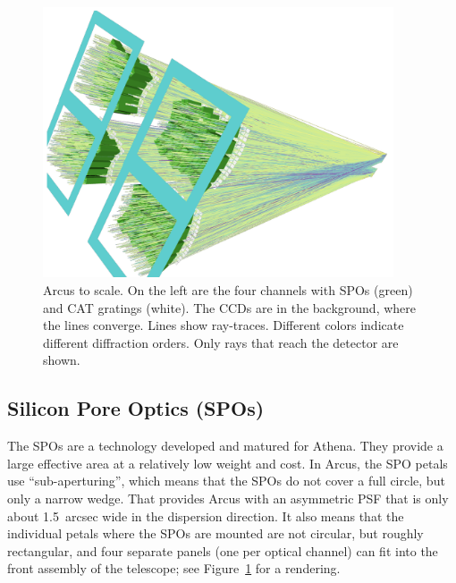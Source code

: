 \documentclass[12pt]{spieman}  %
\begin{document}
\begin{spacing}{1}
\begin{figure}
    \centering
    \includegraphics[height=8cm]{Arcus.png}
    \caption {\label{fig:arcus}
    Arcus to scale. On the left are the four channels with SPOs (green) and CAT gratings (white). The CCDs are in the background, where the lines converge. Lines show ray-traces. Different colors indicate different diffraction orders. Only rays that reach the detector are shown.
}
\end{figure}

\subsection{Silicon Pore Optics (SPOs)}
The SPOs are a technology developed and matured for Athena. They provide a large effective area at a relatively low weight and cost\cite{10.1117/12.2188988,10.1117/12.2599339,10.1117/12.2677388}. In Arcus, the SPO petals use ``sub-aperturing'', which means that the SPOs do not cover a full circle, but only a narrow wedge. That provides Arcus with an asymmetric PSF that is only about 1.5\ arcsec wide in the dispersion direction. It also means that the individual petals where the SPOs are mounted are not circular, but roughly rectangular, and four separate panels (one per optical channel) can fit into the front assembly of the telescope; see Figure~\ref{fig:arcus} for a rendering.


\end{spacing}
\end{document}
